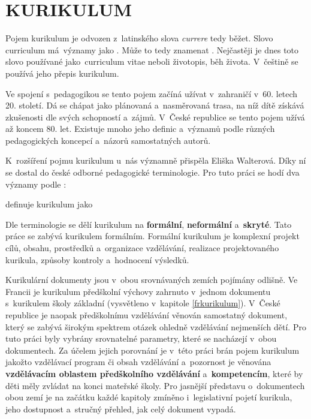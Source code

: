 \chapter{KURIKULUM}
\label{kurikulum}
Pojem kurikulum je odvozen z latinského slova \textit{currere} tedy běžet.  Slovo curriculum má významy jako \textit{}. Může to tedy znamenat \textit{} \citep[s.~24]{Opravilova}. Nejčastěji je dnes toto slovo používané jako curriculum vitae neboli životopis, běh života. V češtině se používá jeho přepis kurikulum.

Ve spojení s pedagogikou se tento pojem začíná užívat v zahraničí v 60. letech 20. století. Dá se chápat jako plánovaná a~nasměrovaná trasa, na níž dítě získává zkušenosti dle svých schopností a~zájmů. V České republice se tento pojem užívá až koncem 80. let. Existuje mnoho jeho definic a~významů podle různých pedagogických koncepcí a~názorů samostatných autorů.

K rozšíření pojmu kurikulum u~nás významně přispěla Eliška Walterová. Díky ní se dostal do české odborné pedagogické terminologie. Pro tuto práci se hodí dva významy podle \citet[s.~15]{Walterova}:


\citet[s.~237]{Prucha} definuje kurikulum jako 

Dle terminologie se dělí kurikulum na \textbf{formální}, \textbf{neformální} a~\textbf{skryté}. Tato práce se zabývá kurikulem formálním. Formální kurikulum je komplexní projekt cílů, obsahu, prostředků a~organizace vzdělávání, realizace projektovaného kurikula, způsoby kontroly a hodnocení výsledků.

Kurikulární dokumenty jsou v~obou srovnávaných zemích pojímány odlišně. Ve Francii je kurikulum předškolní výchovy zahrnuto v~jednom dokumentu s~kurikulem školy základní (vysvětleno v~kapitole \ref{frkurikulum}). V~České republice je naopak předškolnímu vzdělávání věnován samostatný dokument, který se zabývá širokým spektrem otázek ohledně vzdělávání nejmenších dětí. Pro tuto práci byly vybrány srovnatelné parametry, které se nacházejí v obou dokumentech. Za účelem jejich porovnání je v této práci brán pojem kurikulum jakožto vzdělávací program či obsah vzdělávání a~pozornost je věnována \textbf{vzdělávacím oblastem předškolního vzdělávání} a~\textbf{kompetencím}, které by děti měly zvládat na konci mateřské školy. Pro jasnější představu o~dokumentech obou zemí je na začátku každé kapitoly zmíněno i~legislativní pojetí kurikula, jeho dostupnost a~stručný přehled, jak celý dokument vypadá. 

